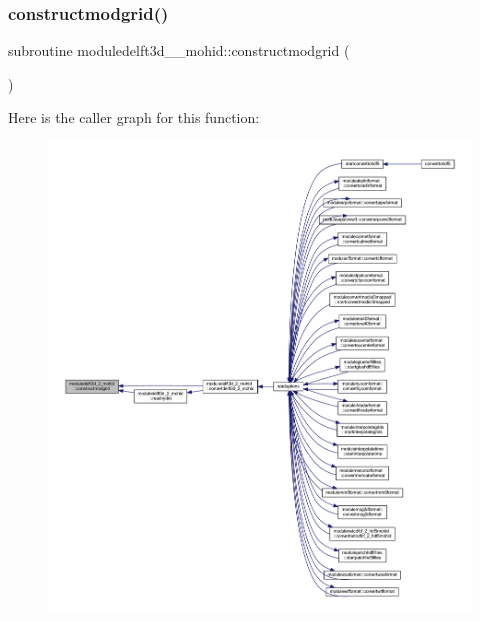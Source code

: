 \subsubsection{\texorpdfstring{constructmodgrid()}{constructmodgrid()}}
{\footnotesize\ttfamily subroutine moduledelft3d\+\_\+\_\+mohid\+::constructmodgrid (\begin{DoxyParamCaption}{ }\end{DoxyParamCaption})\hspace{0.3cm}{\ttfamily [private]}}

Here is the caller graph for this function\+:\nopagebreak
\begin{figure}[H]
\begin{center}
\leavevmode
\includegraphics[width=350pt]{namespacemoduledelft3d__2__mohid_aff52824d2be1932406d107d88fa23498_icgraph}
\end{center}
\end{figure}
\mbox{\label{namespacemoduledelft3d__2__mohid_ab33b3699f757f82a3a7ef54bc7cc7061}} 
